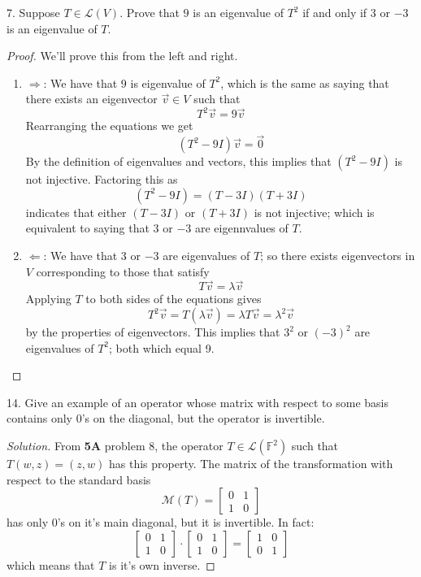 \documentclass{article}
\newcommand{\be}{\begin{enumerate}}
\newcommand{\ee}{\end{enumerate}}
\newcommand{\parens}[1]{\left(#1\right)}
\newcommand{\sqbracks}[1]{\left[#1\right]}
\newcommand{\F}{\mathbb{F}}
\newcommand{\LT}{\mathcal{L}}
\begin{document}
    \item[7.] 
    Suppose $T \in \LT\parens{V}$. Prove that $9$ is an eigenvalue of $T^2$
    if and only if $3$ or $-3$ is an eigenvalue of $T$.
    \begin{proof}
    We'll prove this from the left and right.
    \be 
        \item[$\Longrightarrow$:]
        We have that $9$ is eigenvalue of $T^2$, which is the same as 
        saying that there exists an eigenvector $\vec{v} \in V$ such that
        $$T^2\vec{v} = 9\vec{v}$$
        Rearranging the equations we get 
        $$\parens{T^2 - 9I}\vec{v} = \vec{0}$$
        By the definition of eigenvalues and vectors, this implies that 
        $\parens{T^2 - 9I}$ is not injective. Factoring this as
        $$\parens{T^2 - 9I} = \parens{T - 3I}\parens{T + 3I}$$
        indicates that either $\parens{T - 3I}$ or $\parens{T + 3I}$
        is not injective; which is equivalent to saying that $3$ or $-3$ 
        are eigennvalues of $T$.
        \item[$\Longleftarrow$:] 
        We have that $3$ or $-3$ are eigenvalues of $T$; so there 
        exists eigenvectors in $V$ corresponding to those that satisfy
        $$T\vec{v} = \lambda \vec{v}$$
        Applying $T$ to both sides of the equations gives
        $$T^2\vec{v} = T\parens{\lambda \vec{v}} = \lambda T\vec{v} = 
        \lambda^2 \vec{v}$$
        by the properties of eigenvectors. This implies that $3^2$ or $(-3)
        ^2$ are eigenvalues of $T^2$; both which equal 9.
    \ee
    \end{proof}
    
    \item[14.]
    Give an example of an operator whose matrix with respect to some basis
    contains only 0’s on the diagonal, but the operator is invertible.
    \begin{proof}[Solution]
    From \textbf{5A} problem 8, the operator $T \in \LT\parens{\F^2}$ such 
    that $T(w,z) = (z,w)$ has this property. 
    The matrix of the transformation with respect to the standard basis
    $$\mathcal{M}\parens{T} = \sqbracks{
        \begin{matrix}
            0 & 1 \\
            1 & 0
        \end{matrix}
    }$$
    has only 0's on it's main diagonal, but it is invertible. In fact:
    $$\sqbracks{
        \begin{matrix}
            0 & 1 \\
            1 & 0
        \end{matrix}}\cdot\sqbracks{
        \begin{matrix}
            0 & 1 \\
            1 & 0
        \end{matrix}} = \sqbracks{
        \begin{matrix}
            1 & 0 \\
            0 & 1
        \end{matrix}}$$
        which means that $T$ is it's own inverse.
    \end{proof}
\end{document}
